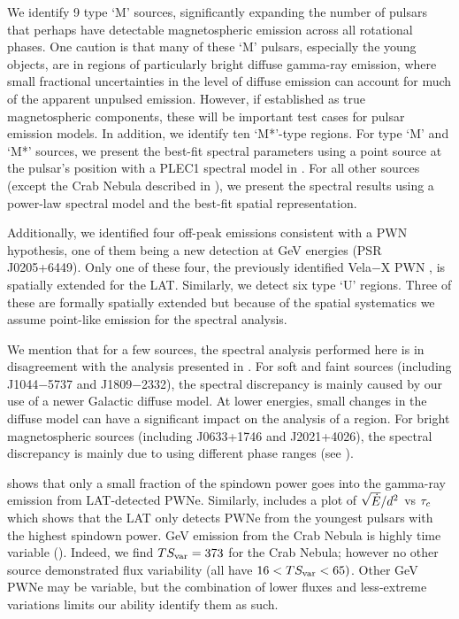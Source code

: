 We identify 9 type `M' sources, significantly expanding the number of
pulsars that perhaps have detectable magnetospheric emission across
all rotational phases.  One caution is that many of these `M' pulsars,
especially the young objects, are in regions of particularly bright
diffuse gamma-ray emission, where small fractional uncertainties in
the level of diffuse emission can account for much of the apparent
unpulsed emission.  However, if established as true magnetospheric
components, these will be important test cases for pulsar emission
models. In addition, we identify ten `M*'-type regions.  For type `M'
and `M*' sources, we present the best-fit spectral parameters using a
point source at the pulsar's position with a PLEC1 spectral model in
.  For all other sources (except the Crab Nebula
described in ), we present the spectral results
using a power-law spectral model and the best-fit spatial representation.

Additionally, we identified four off-peak emissions consistent with
a PWN hypothesis, one of them being a new detection at GeV energies
(PSR J0205+6449).  Only one of these four, the previously identified
Vela$-$X PWN \citep{abdo_2010c_fermi-large}, is spatially extended for
the LAT.  Similarly, we detect six type `U' regions. Three of these are
formally spatially extended but because of the spatial systematics we
assume point-like emission for the spectral analysis.

We mention that for a few sources, the spectral analysis
performed here is in disagreement with the analysis presented in
\citet{ackermann_2011a_fermi-lat-search}. For soft and faint sources
(including J1044$-$5737 and J1809$-$2332), the spectral discrepancy is
mainly caused by our use of a newer Galactic diffuse model. At lower
energies, small changes in the diffuse model can have a significant
impact on the analysis of a region.  For bright magnetospheric sources
(including J0633+1746 and J2021+4026), the spectral discrepancy is mainly
due to using different phase ranges (see ).

 shows that only a small fraction of
the spindown power goes into the gamma-ray emission from LAT-detected
PWNe.  Similarly, \cite{abdo_2013a_second-fermi} includes a plot
of $\sqrt{\dot{E}}/d^2$ vs $\tau_c$ which shows that the LAT
only detects PWNe from the youngest pulsars with the highest spindown
power.  GeV emission from the Crab Nebula is highly time variable
().  Indeed, we find $TS_{\rm var}=373$ for
the Crab Nebula; however no other source demonstrated flux variability
(all have $16 <TS_{\rm var} <65)$.  Other GeV PWNe may be variable,
but the combination of lower fluxes and less-extreme variations limits
our ability identify them as such.

